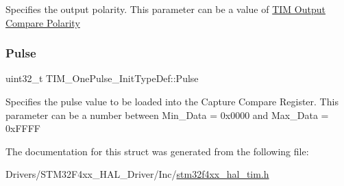 Specifies the output polarity. This parameter can be a value of \hyperlink{group___t_i_m___output___compare___polarity}{T\+IM Output Compare Polarity} \mbox{\label{struct_t_i_m___one_pulse___init_type_def_a4f1fbf6d60812c3194e9ee8a05f5cfa6}} 
\subsubsection{\texorpdfstring{Pulse}{Pulse}}
{\footnotesize\ttfamily uint32\+\_\+t T\+I\+M\+\_\+\+One\+Pulse\+\_\+\+Init\+Type\+Def\+::\+Pulse}

Specifies the pulse value to be loaded into the Capture Compare Register. This parameter can be a number between Min\+\_\+\+Data = 0x0000 and Max\+\_\+\+Data = 0x\+F\+F\+FF 

The documentation for this struct was generated from the following file\+:\begin{DoxyCompactItemize}
\item 
Drivers/\+S\+T\+M32\+F4xx\+\_\+\+H\+A\+L\+\_\+\+Driver/\+Inc/\hyperlink{stm32f4xx__hal__tim_8h}{stm32f4xx\+\_\+hal\+\_\+tim.\+h}\end{DoxyCompactItemize}
